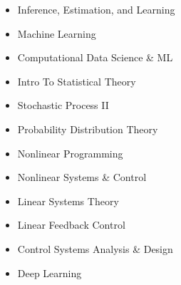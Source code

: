 \documentclass[10pt,a4paper,ragged2e,withhyper]{altacv}
\begin{document}
    

  
\begin{paracol}{2}

\switchcolumn
{}
\vspace{-0.5em}
\divider
{}
\vspace{-0.5em}
\divider
{}
\vspace{-0.5em}

\begin{itemize}[itemsep=-2pt, parsep=4pt]
    \item Inference, Estimation, and Learning
    \item Machine Learning
    \item Computational Data Science \& ML
    \item Intro To Statistical Theory
    \item Stochastic Process II
    \item Probability Distribution Theory
    \item Nonlinear Programming
    \item Nonlinear Systems \& Control 
    \item Linear Systems Theory
    \item Linear Feedback Control
    \item Control Systems Analysis \& Design
    \item Deep Learning
\end{itemize}


\end{paracol}
\end{document}
